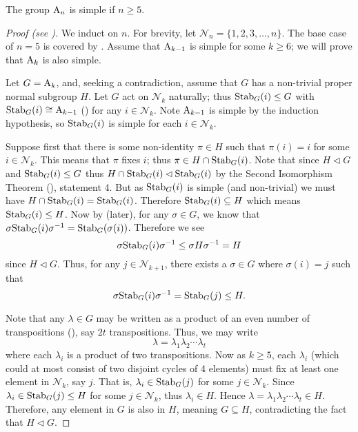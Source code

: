 \begin{theorem}\label{thrm-An-is-simple-for-n>=5}
    The group $\mathrm{A}_{n}$ is simple if $n \geq 5$.
\end{theorem}
\begin{proof}[Proof (see {\cite[Theorem 4.24]{dummit_foote_2004}})]
    We induct on $n$. For brevity, let $\mathcal{N}_n = \{1, 2, 3, \dots, n\}$. The base case of $n = 5$ is covered by . Assume that $\mathrm{A}_{k-1}$ is simple for some $k \geq 6$; we will prove that $\mathrm{A}_{k}$ is also simple.

    Let $G = \mathrm{A}_{k}$, and, seeking a contradiction, assume that $G$ has a non-trivial proper normal subgroup $H$. Let $G$ act on $\mathcal{N}_{k}$ naturally; thus $\mathrm{Stab}_{G}(i) \leq G$ with $\mathrm{Stab}_{G}(i) \cong \mathrm{A}_{k-1}$ () for any $i \in \mathcal{N}_k$. Note $\mathrm{A}_{k-1}$ is simple by the induction hypothesis, so $\mathrm{Stab}_{G}(i)$ is simple for each $i \in \mathcal{N}_{k}$.

    Suppose first that there is some non-identity $\pi \in H$ such that $\pi(i) = i$ for some $i \in \mathcal{N}_{k}$. This means that $\pi$ fixes $i$; thus $\pi \in H \cap \mathrm{Stab}_{G}(i)$. Note that since $H \lhd G$ and $\mathrm{Stab}_{G}(i) \leq G$ thus $H \cap \mathrm{Stab}_{G}(i) \lhd \mathrm{Stab}_{G}(i)$ by the Second Isomorphism Theorem (), statement 4. But as $\mathrm{Stab}_{G}(i)$ is simple (and non-trivial) we must have $H \cap \mathrm{Stab}_{G}(i) = \mathrm{Stab}_{G}(i)$. Therefore $\mathrm{Stab}_{G}(i) \subseteq H$ which means $\mathrm{Stab}_{G}(i) \leq H$. Now by  (later), for any $\sigma \in G$, we know that $\sigma\mathrm{Stab}_{G}(i)\sigma^{-1} = \mathrm{Stab}_{G}(\sigma(i))$. Therefore we see
    \[
        \sigma\mathrm{Stab}_{G}(i)\sigma^{-1} \leq \sigma H\sigma^{-1} = H
    \]
    since $H \lhd G$. Thus, for any $j \in \mathcal{N}_{k+1}$, there exists a $\sigma \in G$ where $\sigma(i) = j$ such that
    \[
        \sigma\mathrm{Stab}_{G}(i)\sigma^{-1} = \mathrm{Stab}_{G}(j) \leq H.
    \]

    Note that any $\lambda \in G$ may be written as a product of an even number of transpositions (), say $2t$ transpositions. Thus, we may write
    \[
        \lambda = \lambda_1\lambda_2\cdots\lambda_t
    \]
    where each $\lambda_i$ is a product of two transpositions. Now as $k \geq 5$, each $\lambda_i$ (which could at most consist of two disjoint cycles of 4 elements) must fix at least one element in $\mathcal{N}_{k}$, say $j$. That is, $\lambda_i \in \mathrm{Stab}_{G}(j)$ for some $j \in \mathcal{N}_{k}$. Since $\lambda_i \in \mathrm{Stab}_{G}(j) \leq H$ for some $j \in \mathcal{N}_{k}$, thus $\lambda_i \in H$. Hence $\lambda = \lambda_1\lambda_2\cdots\lambda_t \in H$. Therefore, any element in $G$ is also in $H$, meaning $G \subseteq H$, contradicting the fact that $H \lhd G$.


\end{proof}
